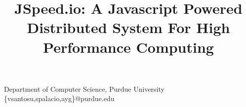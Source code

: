 \documentclass[10pt,reprint]{socc14}
\begin{document}
	
\setlength{\pdfpageheight}{\paperheight}
\setlength{\pdfpagewidth}{\paperwidth}






\title{JSpeed.io: A Javascript Powered Distributed System For High Performance Computing}

           {Department of Computer Science, Purdue University}
           {\{vsantosu,spalacio,ayg\}@purdue.edu}

\maketitle
\end{document}
